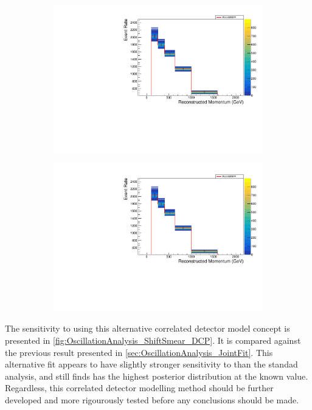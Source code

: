 \begin{figure}[h]
\begin{subfigure}[t]{0.49\textwidth}
    \includegraphics[width=\textwidth, trim={0mm 0mm 0mm 0mm}, clip,page=9]{Figures/OA/Overlay_ShiftSmear.pdf}
  \end{subfigure}%
  \begin{subfigure}[t]{0.49\textwidth}
    \includegraphics[width=\textwidth, trim={0mm 0mm 0mm 0mm}, clip,page=12]{Figures/OA/Overlay_ShiftSmear.pdf}
  \end{subfigure}
  \caption{}
  \label{fig:OscillationAnalysis_ShiftSmearPosteriorPred}
\end{figure}

The sensitivity to  using this alternative correlated detector model concept is presented in \autoref{fig:OscillationAnalysis_ShiftSmear_DCP}. It is compared against the previous result presented in \autoref{sec:OscillationAnalysis_JointFit}. This alternative fit appears to have slightly stronger sensitivity to  than the standad analysis, and still finds has the highest posterior distribution at the known value. Regardless, this correlated detector modelling method should be further developed and more rigourously tested before any conclusions should be made.


